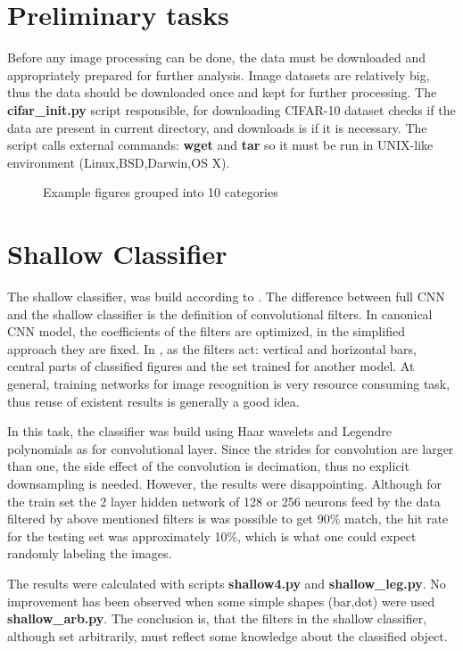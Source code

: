 \documentclass{article}
\begin{document}
\section{Preliminary tasks}

Before any image processing can be done, the data must be downloaded and appropriately prepared
for further analysis. Image datasets are relatively big, thus
the data should be downloaded once and kept for further processing. The {\bf cifar\_init.py}
script responsible, for downloading CIFAR-10 dataset checks if the data are present in current directory,
and downloads is if it is necessary. The script calls external commands: {\bf wget} and
{\bf tar} so it must be run in UNIX-like environment (Linux,BSD,Darwin,OS X).

\begin{figure}[!hbt]
  \centering
  \caption{Example figures grouped into 10 categories}
\end{figure}


\section{Shallow Classifier \label{sec}}

The shallow classifier, was build according to \cite{shallow}. The difference
between full CNN and the shallow classifier is the definition of convolutional
filters. In canonical CNN model, the coefficients of the filters are optimized,
in the simplified approach they are fixed. In \cite{shallow}, as
the filters act: vertical and horizontal bars, central parts of classified
figures and the set trained for another model. At general, training networks
for image recognition is very resource consuming task, thus reuse of existent
results is generally a good idea.

In this task, the classifier was build using Haar wavelets and Legendre polynomials
as for convolutional layer. Since the strides for convolution are larger than one,
the side effect of the convolution is decimation, thus no explicit downsampling is
needed. However, the results were disappointing. Although for the
train set the 2 layer hidden network of 128 or 256 neurons feed by
the data filtered by above mentioned filters is was possible to get 90\% match,
the hit rate for the testing set was approximately 10\%, which is
what one could expect randomly labeling the images. 

The results were calculated with scripts {\bf shallow4.py} and {\bf shallow\_leg.py}.
No improvement has been observed when some simple shapes (bar,dot) were used
{\bf shallow\_arb.py}. The conclusion is, that the filters in the shallow
classifier, although set arbitrarily, must reflect some knowledge about
the classified object.
\end{document}
